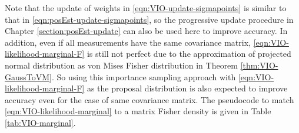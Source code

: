 Note that the update of weights in \eqref{eqn:VIO-update-sigmapoints} is similar to that in \eqref{eqn:posEst-update-sigmapoints}, so the progressive update procedure in Chapter \ref{section:posEst-update} can also be used here to improve accuracy.
In addition, even if all measurements have the same covariance matrix, \eqref{eqn:VIO-likelihood-marginal-F} is still not perfect due to the approximation of projected normal distribution as von Mises Fisher distribution in Theorem \ref{thm:VIO-GaussToVM}.
So using this importance sampling approach with \eqref{eqn:VIO-likelihood-marginal-F} as the proposal distribution is also expected to improve accuracy even for the case of same covariance matrix.
The pseudocode to match \eqref{eqn:VIO-likelihood-marginal} to a matrix Fisher density is given in Table \ref{tab:VIO-marginal}.

